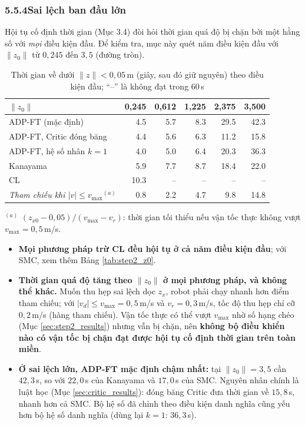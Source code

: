 \documentclass[12pt,a4paper]{article}
\makeatletter
\newcommand{\seclabel}[2]{\phantomsection\protected@edef\@currentlabel{#2}\label{#1}}
\makeatother
\begin{document}
\subsubsection*{5.5.4\quad Sai lệch ban đầu lớn}
\seclabel{sec:z0_sweep}{5.5.4}

Hội tụ cố định thời gian (Mục 3.4) đòi hỏi thời gian quá độ bị chặn bởi một hằng số với \textit{mọi} điều kiện đầu. Để kiểm tra, mục này quét năm điều kiện đầu với $\|z_0\|$ từ $0{,}245$ đến $3{,}5$ (đường tròn).

\begin{table}[H]
\centering
\caption{Thời gian về dưới $\|z\| < 0{,}05$\,m (giây, sau đó giữ nguyên) theo điều kiện đầu; ``--'' là không đạt trong 60\,s}
\label{tab:z0_tsettle}
\small
\begin{tabular}{lrrrrr}
\toprule
$\|z_0\|$ & \textbf{0,245} & \textbf{0,612} & \textbf{1,225} & \textbf{2,375} & \textbf{3,500} \\
\midrule
ADP-FT (mặc định) & 4.5 & 5.7 & 8.3 & 29.5 & 42.3 \\
ADP-FT, Critic đóng băng & 4.4 & 5.6 & 6.3 & 11.2 & 15.8 \\
ADP-FT, hệ số nhân $k = 1$ & 4.0 & 5.0 & 6.4 & 20.3 & 36.3 \\
Kanayama & 5.9 & 7.7 & 8.7 & 18.4 & 22.0 \\
CL & 10.3 & -- & -- & -- & -- \\
\midrule
\textit{Tham chiếu khi $|v| \leq v_{\max}$}$^{(a)}$ & 0.8 & 2.2 & 4.7 & 9.8 & 14.8 \\
\bottomrule
\end{tabular}

\vspace{0.15cm}
{\footnotesize\raggedright $^{(a)}$ $(z_{x0} - 0{,}05)/(v_{\max} - v_r)$: thời gian tối thiểu nếu vận tốc thực không vượt $v_{\max} = 0{,}5$\,m/s.}
\end{table}

\begin{itemize}
    \item \textbf{Mọi phương pháp trừ CL đều hội tụ ở cả năm điều kiện đầu}; với SMC, xem thêm Bảng \ref{tab:step2_z0}.
    \item \textbf{Thời gian quá độ tăng theo $\|z_0\|$ ở mọi phương pháp, và không thể khác.} Muốn thu hẹp sai lệch dọc $z_x$, robot phải chạy nhanh hơn điểm tham chiếu; với $|v_d| \leq v_{\max} = 0{,}5$\,m/s và $v_r = 0{,}3$\,m/s, tốc độ thu hẹp chỉ cỡ $0{,}2$\,m/s (hàng tham chiếu). Vận tốc thực có thể vượt $v_{\max}$ nhờ số hạng chéo (Mục \ref{sec:step2_results}) nhưng vẫn bị chặn, nên \textbf{không bộ điều khiển nào có vận tốc bị chặn đạt được hội tụ cố định thời gian trên toàn miền}.
    \item \textbf{Ở sai lệch lớn, ADP-FT mặc định chậm nhất:} tại $\|z_0\| = 3{,}5$ cần $42{,}3$\,s, so với $22{,}0$\,s của Kanayama và $17{,}0$\,s của SMC. Nguyên nhân chính là luật học (Mục \ref{sec:critic_results}): đóng băng Critic đưa thời gian về $15{,}8$\,s, nhanh hơn cả SMC. Bộ hệ số đã chỉnh theo điều kiện danh nghĩa cũng yếu hơn bộ hệ số danh nghĩa (dùng lại $k = 1$: $36{,}3$\,s).
\end{itemize}
\end{document}
